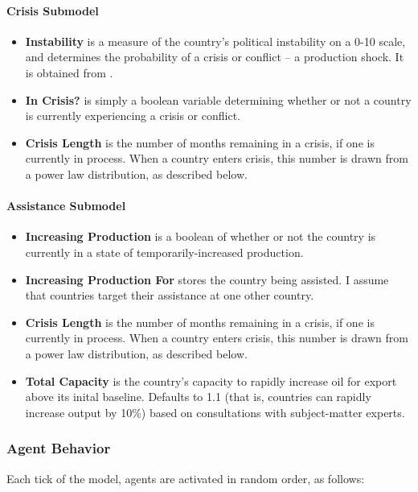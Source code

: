 \documentclass{article}
\begin{document}
\paragraph{Crisis Submodel}
\begin{itemize}
	\item \textbf{Instability} is a measure of the country's political instability on a 0-10 scale, and determines the probability of a crisis or conflict -- a production shock. It is obtained from \citet{eiu_2013}. 
	\item \textbf{In Crisis?} is simply a boolean variable determining whether or not a country is currently experiencing a crisis or conflict.
	\item \textbf{Crisis Length} is the number of months remaining in a crisis, if one is currently in process. When a country enters crisis, this number is drawn from a power law distribution, as described below.
\end{itemize}

\paragraph{Assistance Submodel}
\begin{itemize}
	\item \textbf{Increasing Production} is a boolean of whether or not the country is currently in a state of temporarily-increased production.
	\item \textbf{Increasing Production For} stores the country being assisted. I assume that countries target their assistance at one other country.
		\item \textbf{Crisis Length} is the number of months remaining in a crisis, if one is currently in process. When a country enters crisis, this number is drawn from a power law distribution, as described below.
			\item \textbf{Total Capacity} is the country's capacity to rapidly increase oil for export above its inital baseline. Defaults to 1.1 (that is, countries can rapidly increase output by 10\%) based on consultations with subject-matter experts. 
\end{itemize}

\subsubsection{Agent Behavior}

Each tick of the model, agents are activated in random order, as follows:
\end{document}
